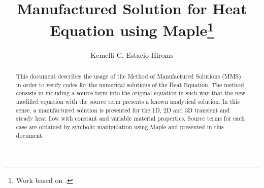 \documentclass[a4paper,10pt]{article}
\title{Manufactured Solution for Heat Equation using Maple\footnote{Work based on \cite{Kirk2009}.}}
\author{Kemelli C. Estacio-Hiroms}
\begin{document}
\maketitle

\begin{abstract}
This document describes the usage of the Method of Manufactured Solutions (MMS) in order to verify codes for the numerical solutions of the Heat Equation. The method consists in including a source term into the original equation in such way that the new modified equation with the source term presents a known analytical solution. In this sense, a manufactured solution is presented for the 1D, 2D and 3D transient and steady heat flow with constant and variable material properties. Source terms for each case are obtained by symbolic manipulation using Maple and presented in this document.
\end{abstract}
\end{document}
